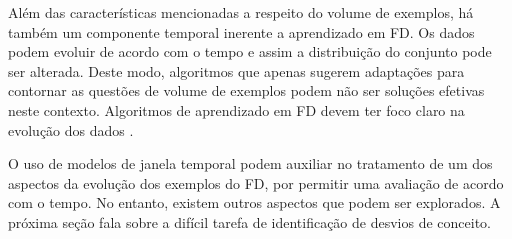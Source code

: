 Além das características mencionadas a respeito do volume de exemplos, há também um componente temporal inerente a aprendizado em FD. Os dados podem evoluir de acordo com o tempo e assim a distribuição do conjunto pode ser alterada. Deste modo, algoritmos que apenas sugerem adaptações para contornar as questões de volume de exemplos podem não ser soluções efetivas neste contexto. Algoritmos de aprendizado em FD devem ter foco claro na evolução dos dados \cite{aggarwal2007:Ch1}.

O uso de modelos de janela temporal podem auxiliar no tratamento de um dos aspectos da evolução dos exemplos do FD, por permitir uma avaliação de acordo com o tempo. No entanto, existem outros aspectos que podem ser explorados. A próxima seção fala sobre a difícil tarefa de identificação de desvios de conceito.